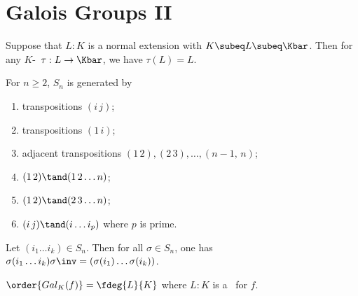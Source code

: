 \documentclass[a4paper]{article}
\begin{document}
\section{Galois Groups II}
\begin{tlemma}
  Suppose that \( L:K \) is a normal extension with \( K\subeq L\subeq \Kbar \).
  Then for any \( K \)-\homo~\( \tau:L\to \Kbar \), we have \( \tau(L) = L \).
\end{tlemma}

\begin{tlemma}
  For \( n\geq 2 \), \( S_n \) is generated by \begin{enumerate}
    \item transpositions \( (i\,j) \);
    \item transpositions \( (1\,i) \);
    \item adjacent transpositions \( (1\,2),(2\,3),\ldots,(n-1,\, n) \);
    \item \( (1\,2)\tand (1\,2\ldots n) \);
    \item \( (1\,2)\tand (2\,3\ldots n) \);
    \item \( (i\,j)\tand (i\ldots i_p) \) where \( p \) is prime.
  \end{enumerate}
\end{tlemma}

\begin{tlemma}
  Let \( (i_1\ldots i_k)\in S_n \).
  Then for all \( \sigma\in S_n \), one has \( \sigma(i_1\ldots i_k)\sigma\inv = (\sigma(i_1)\ldots\sigma(i_k)) \).
\end{tlemma}

\quad \( \order{Gal_K(f)} = \fdeg{L}{K} \) where \( L:K \) is a \sfe~for \( f \).
\end{document}
